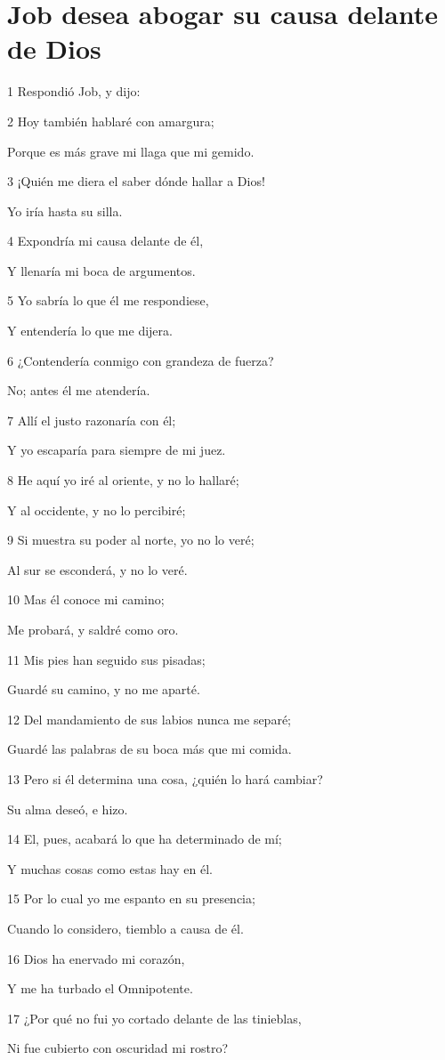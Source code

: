 \section*{Job desea abogar su causa delante de Dios}

\par 1 Respondió Job, y dijo:
\par 2 Hoy también hablaré con amargura;
\par Porque es más grave mi llaga que mi gemido.
\par 3 ¡Quién me diera el saber dónde hallar a Dios!
\par Yo iría hasta su silla.
\par 4 Expondría mi causa delante de él,
\par Y llenaría mi boca de argumentos.
\par 5 Yo sabría lo que él me respondiese,
\par Y entendería lo que me dijera.
\par 6 ¿Contendería conmigo con grandeza de fuerza? 
\par No; antes él me atendería.
\par 7 Allí el justo razonaría con él;
\par Y yo escaparía para siempre de mi juez.
\par 8 He aquí yo iré al oriente, y no lo hallaré;
\par Y al occidente, y no lo percibiré;
\par 9 Si muestra su poder al norte, yo no lo veré;
\par Al sur se esconderá, y no lo veré.
\par 10 Mas él conoce mi camino;
\par Me probará, y saldré como oro.
\par 11 Mis pies han seguido sus pisadas;
\par Guardé su camino, y no me aparté.
\par 12 Del mandamiento de sus labios nunca me separé;
\par Guardé las palabras de su boca más que mi comida.
\par 13 Pero si él determina una cosa, ¿quién lo hará cambiar?
\par Su alma deseó, e hizo.
\par 14 El, pues, acabará lo que ha determinado de mí;
\par Y muchas cosas como estas hay en él.
\par 15 Por lo cual yo me espanto en su presencia;
\par Cuando lo considero, tiemblo a causa de él.
\par 16 Dios ha enervado mi corazón, 
\par Y me ha turbado el Omnipotente.
\par 17 ¿Por qué no fui yo cortado delante de las tinieblas,
\par Ni fue cubierto con oscuridad mi rostro?

